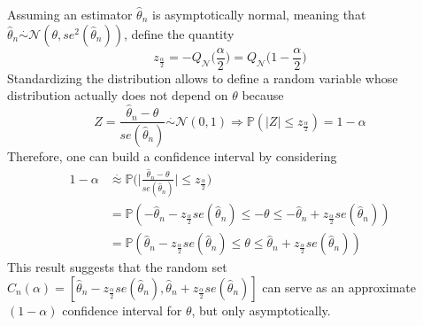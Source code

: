 \documentclass{report}
\begin{document}
\begin{examplebox}
    Assuming an estimator $\displaystyle \hat{\theta}_n$ is asymptotically normal, meaning that $\displaystyle \hat{\theta}_n \stackrel{.}{\sim} \mathcal{N}(\theta, se^2(\hat{\theta}_n))$, define the quantity
    \[z_{\frac{\alpha}{2}} = -Q_{\mathcal{N}}\bigg(\frac{\alpha}{2}\bigg) = Q_{\mathcal{N}}\bigg(1 - \frac{\alpha}{2}\bigg)\]
    Standardizing the distribution allows to define a random variable whose distribution actually does not depend on $\displaystyle \theta$ because
    \[Z = \frac{\hat{\theta}_n - \theta}{se(\hat{\theta}_n)} \stackrel{.}{\sim} \mathcal{N}(0, 1) \Rightarrow \mathbb{P}(|Z| \leq z_{\frac{\alpha}{2}}) = 1 - \alpha\]
    Therefore, one can build a confidence interval by considering
    \begin{align*}
        1 - \alpha
            &\stackrel{.}{\approx} \mathbb{P}\Bigg(\Bigg|\frac{\hat{\theta}_n - \theta}{se(\hat{\theta}_n)}\Bigg| \leq z_{\frac{\alpha}{2}}\Bigg) \\
            &= \mathbb{P}(-\hat{\theta}_n - z_{\frac{\alpha}{2}}se(\hat{\theta}_n) \leq - \theta \leq -\hat{\theta}_n + z_{\frac{\alpha}{2}}se(\hat{\theta}_n)) \\
            &= \mathbb{P}(\hat{\theta}_n - z_{\frac{\alpha}{2}}se(\hat{\theta}_n) \leq \theta \leq \hat{\theta}_n + z_{\frac{\alpha}{2}}se(\hat{\theta}_n))
    \end{align*}
    This result suggests that the random set $\displaystyle C_n(\alpha) = [\hat{\theta}_n - z_{\frac{\alpha}{2}}se(\hat{\theta}_n), \hat{\theta}_n + z_{\frac{\alpha}{2}}se(\hat{\theta}_n)]$ can serve as an approximate $\displaystyle (1 - \alpha)$ confidence interval for $\displaystyle \theta$, but only asymptotically.
\end{examplebox}
\end{document}
